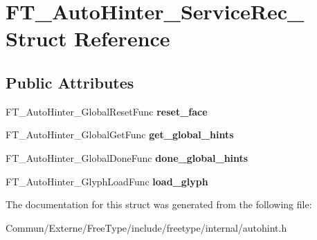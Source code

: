 \hypertarget{struct_f_t___auto_hinter___service_rec__}{}\section{F\+T\+\_\+\+Auto\+Hinter\+\_\+\+Service\+Rec\+\_\+ Struct Reference}
\label{struct_f_t___auto_hinter___service_rec__}
\subsection*{Public Attributes}
\begin{DoxyCompactItemize}
\item 
F\+T\+\_\+\+Auto\+Hinter\+\_\+\+Global\+Reset\+Func {\bfseries reset\+\_\+face}\hypertarget{struct_f_t___auto_hinter___service_rec___a846234a9c9c5427d3274e4568f33272c}{}\label{struct_f_t___auto_hinter___service_rec___a846234a9c9c5427d3274e4568f33272c}

\item 
F\+T\+\_\+\+Auto\+Hinter\+\_\+\+Global\+Get\+Func {\bfseries get\+\_\+global\+\_\+hints}\hypertarget{struct_f_t___auto_hinter___service_rec___a958371c33e08125393cd4b401a22f2a0}{}\label{struct_f_t___auto_hinter___service_rec___a958371c33e08125393cd4b401a22f2a0}

\item 
F\+T\+\_\+\+Auto\+Hinter\+\_\+\+Global\+Done\+Func {\bfseries done\+\_\+global\+\_\+hints}\hypertarget{struct_f_t___auto_hinter___service_rec___a648ac943fc1194f60ba638e0a59486e9}{}\label{struct_f_t___auto_hinter___service_rec___a648ac943fc1194f60ba638e0a59486e9}

\item 
F\+T\+\_\+\+Auto\+Hinter\+\_\+\+Glyph\+Load\+Func {\bfseries load\+\_\+glyph}\hypertarget{struct_f_t___auto_hinter___service_rec___ad36efe39469959626744ebdd04a04031}{}\label{struct_f_t___auto_hinter___service_rec___ad36efe39469959626744ebdd04a04031}

\end{DoxyCompactItemize}


The documentation for this struct was generated from the following file\+:\begin{DoxyCompactItemize}
\item 
Commun/\+Externe/\+Free\+Type/include/freetype/internal/autohint.\+h\end{DoxyCompactItemize}
